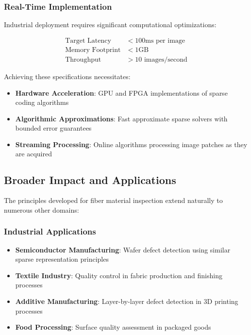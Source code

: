 \documentclass[12pt]{article}
\begin{document}
\subsubsection{Real-Time Implementation}
\label{subsubsec:realtime_implementation}

Industrial deployment requires significant computational optimizations:

\begin{align}
    \text{Target Latency}   & < 100\text{ms per image} \label{eq:latency_target}     \\
    \text{Memory Footprint} & < 1\text{GB} \label{eq:memory_target}                  \\
    \text{Throughput}       & > 10\text{ images/second} \label{eq:throughput_target}
\end{align}

Achieving these specifications necessitates:

\begin{itemize}[leftmargin=*]
    \item \textbf{Hardware Acceleration}: GPU and FPGA implementations of sparse coding algorithms
    \item \textbf{Algorithmic Approximations}: Fast approximate sparse solvers with bounded error guarantees
    \item \textbf{Streaming Processing}: Online algorithms processing image patches as they are acquired
\end{itemize}

\subsection{Broader Impact and Applications}
\label{subsec:broader_impact}

The principles developed for fiber material inspection extend naturally to numerous other domains:

\subsubsection{Industrial Applications}
\label{subsubsec:industrial_applications}

\begin{itemize}[leftmargin=*]
    \item \textbf{Semiconductor Manufacturing}: Wafer defect detection using similar sparse representation principles
    \item \textbf{Textile Industry}: Quality control in fabric production and finishing processes
    \item \textbf{Additive Manufacturing}: Layer-by-layer defect detection in 3D printing processes
    \item \textbf{Food Processing}: Surface quality assessment in packaged goods
\end{itemize}
\end{document}
